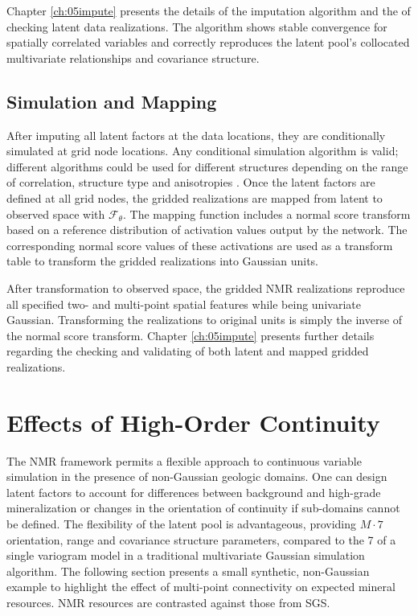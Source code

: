 Chapter \ref{ch:05impute} presents the details of the imputation algorithm and the of checking latent data realizations. The algorithm shows stable convergence for spatially correlated variables and correctly reproduces the latent pool's collocated multivariate relationships and covariance structure.

\subsection{Simulation and Mapping}
\label{subsec:03simulate}

After imputing all latent factors at the data locations, they are conditionally simulated at grid node locations. Any conditional simulation algorithm is valid; different algorithms could be used for different structures depending on the range of correlation, structure type and anisotropies \citep{pinto2020independent}. Once the latent factors are defined at all grid nodes, the gridded realizations are mapped from latent to observed space with $\mathcal{F}_{\theta}$. The mapping function includes a normal score transform based on a reference distribution of activation values output by the network. The corresponding normal score values of these activations are used as a transform table to transform the gridded realizations into Gaussian units.

After transformation to observed space, the gridded \gls{NMR} realizations reproduce all specified two- and multi-point spatial features while being univariate Gaussian. Transforming the realizations to original units is simply the inverse of the normal score transform. Chapter \ref{ch:05impute} presents further details regarding the checking and validating of both latent and mapped gridded realizations.


\FloatBarrier
\section{Effects of High-Order Continuity}
\label{sec:03effect}

The \gls{NMR} framework permits a flexible approach to continuous variable simulation in the presence of non-Gaussian geologic domains. One can design latent factors to account for differences between background and high-grade mineralization or changes in the orientation of continuity if sub-domains cannot be defined. The flexibility of the latent pool is advantageous, providing $M \cdot 7$ orientation, range and covariance structure parameters, compared to the 7 of a single variogram model in a traditional multivariate Gaussian simulation algorithm. The following section presents a small synthetic, non-Gaussian example to highlight the effect of multi-point connectivity on expected mineral resources. \Gls{NMR} resources are contrasted against those from \gls{SGS}.

